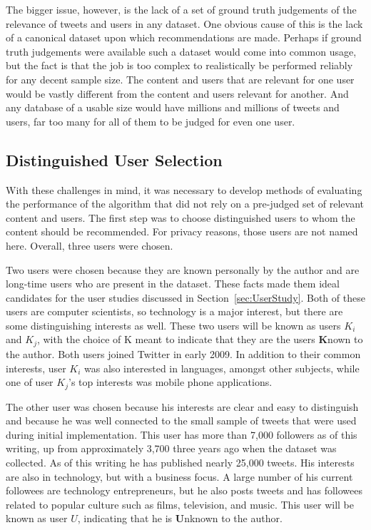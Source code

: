 The bigger issue, however, is the lack of a set of ground truth judgements of the relevance of tweets and users in any dataset. One obvious cause of this is the lack of a canonical dataset upon which recommendations are made. Perhaps if ground truth judgements were available such a dataset would come into common usage, but the fact is that the job is too complex to realistically be performed reliably for any decent sample size. The content and users that are relevant for one user would be vastly different from the content and users relevant for another. And any database of a usable size would have millions and millions of tweets and users, far too many for all of them to be judged for even one user.


\subsection{Distinguished User Selection}

With these challenges in mind, it was necessary to develop methods of evaluating the performance of the algorithm that did not rely on a pre-judged set of relevant content and users. The first step was to choose distinguished users to whom the content should be recommended. For privacy reasons, those users are not named here. Overall, three users were chosen.

Two users were chosen because they are known personally by the author and are long-time users who are present in the dataset. These facts made them ideal candidates for the user studies discussed in Section~\ref{sec:UserStudy}. Both of these users are computer scientists, so technology is a major interest, but there are some distinguishing interests as well. These two users will be known as users $K_{i}$ and $K_{j}$, with the choice of K meant to indicate that they are the users {\bf K}nown to the author. Both users joined Twitter in early 2009. In addition to their common interests, user $K_{i}$ was also interested in languages, amongst other subjects, while one of user $K_{j}$'s top interests was mobile phone applications.

The other user was chosen because his interests are clear and easy to distinguish and because he was well connected to the small sample of tweets that were used during initial implementation. This user has more than 7,000 followers as of this writing, up from approximately 3,700 three years ago when the dataset was collected. As of this writing he has published nearly 25,000 tweets. His interests are also in technology, but with a business focus. A large number of his current followees are technology entrepreneurs, but he also posts tweets and has followees related to popular culture such as films, television, and music. This user will be known as user $U$, indicating that he is {\bf U}nknown to the author.



